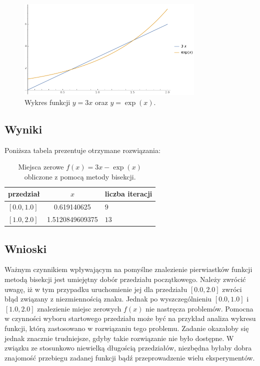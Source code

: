 \documentclass{classrep}
\begin{document}
		\begin{figure}[!htbp]
			\centering
			\includegraphics[width=0.8\textwidth]{zadania/plot51.png}
  			\caption{Wykres funkcji $y=3x$ oraz $y=\exp(x)$.}
  			\label{fig:1}
		\end{figure}	
		
	\subsection{Wyniki}
		Poniższa tabela prezentuje otrzymane rozwiązania:
		\begin{table}[!hpbt]
        		\centering
        		\footnotesize
			\begin{tabular}{lSl} \toprule
				{przedział} & {$x$} & {liczba iteracji}\\ \midrule
				$[0.0,1.0]$ & 0.619140625 & $9$ \\ 
	 			$[1.0,2.0]$ & 1.5120849609375 & $13$ \\ \bottomrule
	 		\end{tabular}
	 		\caption{Miejsca zerowe $f(x)=3x-\exp(x)$ obliczone z pomocą metody bisekcji.}
			\label{table:2}
		\end{table}	
		
	\subsection{Wnioski}
		Ważnym czynnikiem wpływającym na pomyślne znalezienie pierwiastków funkcji metodą bisekcji jest umiejętny dobór przedziału początkowego. Należy zwrócić uwagę, iż w tym przypadku uruchomienie jej dla przedziału $[0.0,2.0]$ zwróci błąd związany z niezmiennością znaku. Jednak po wyszczególnieniu $[0.0,1.0]$ i $[1.0,2.0]$ znalezienie miejsc zerowych $f(x)$ nie nastręcza problemów. Pomocna w czynności wyboru startowego przedziału może być na przykład analiza wykresu funkcji, którą zastosowano w rozwiązaniu tego problemu. Zadanie okazałoby się jednak znacznie trudniejsze, gdyby takie rozwiązanie nie było dostępne. W związku ze stosunkowo niewielką długością przedziałów, niezbędna byłaby dobra znajomość przebiegu zadanej funkcji bądź przeprowadzenie wielu eksperymentów. 
		
\end{document}
